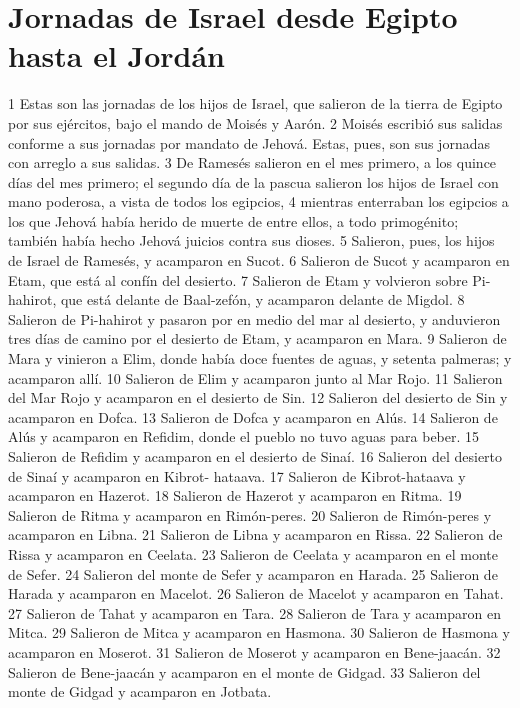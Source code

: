 \section*{Jornadas de Israel desde Egipto hasta el Jordán}

1 Estas son las jornadas de los hijos de Israel, que salieron de la tierra de Egipto por sus ejércitos, bajo el mando de Moisés y Aarón.
2 Moisés escribió sus salidas conforme a sus jornadas por mandato de Jehová. Estas, pues, son sus jornadas con arreglo a sus salidas.
3 De Ramesés salieron en el mes primero, a los quince días del mes primero; el segundo día de la pascua salieron los hijos de Israel con mano poderosa, a vista de todos los egipcios,
4 mientras enterraban los egipcios a los que Jehová había herido de muerte de entre ellos, a todo primogénito; también había hecho Jehová juicios contra sus dioses.
5 Salieron, pues, los hijos de Israel de Ramesés, y acamparon en Sucot.
6 Salieron de Sucot y acamparon en Etam, que está al confín del desierto.
7 Salieron de Etam y volvieron sobre Pi-hahirot, que está delante de Baal-zefón, y acamparon delante de Migdol.
8 Salieron de Pi-hahirot y pasaron por en medio del mar al desierto, y anduvieron tres días de camino por el desierto de Etam, y acamparon en Mara.
9 Salieron de Mara y vinieron a Elim, donde había doce fuentes de aguas, y setenta palmeras; y acamparon allí.
10 Salieron de Elim y acamparon junto al Mar Rojo.
11 Salieron del Mar Rojo y acamparon en el desierto de Sin.
12 Salieron del desierto de Sin y acamparon en Dofca.
13 Salieron de Dofca y acamparon en Alús.
14 Salieron de Alús y acamparon en Refidim, donde el pueblo no tuvo aguas para beber.
15 Salieron de Refidim y acamparon en el desierto de Sinaí.
16 Salieron del desierto de Sinaí y acamparon en Kibrot- hataava.
17 Salieron de Kibrot-hataava y acamparon en Hazerot.
18 Salieron de Hazerot y acamparon en Ritma.
19 Salieron de Ritma y acamparon en Rimón-peres.
20 Salieron de Rimón-peres y acamparon en Libna.
21 Salieron de Libna y acamparon en Rissa.
22 Salieron de Rissa y acamparon en Ceelata.
23 Salieron de Ceelata y acamparon en el monte de Sefer.
24 Salieron del monte de Sefer y acamparon en Harada.
25 Salieron de Harada y acamparon en Macelot.
26 Salieron de Macelot y acamparon en Tahat.
27 Salieron de Tahat y acamparon en Tara.
28 Salieron de Tara y acamparon en Mitca.
29 Salieron de Mitca y acamparon en Hasmona.
30 Salieron de Hasmona y acamparon en Moserot.
31 Salieron de Moserot y acamparon en Bene-jaacán.
32 Salieron de Bene-jaacán y acamparon en el monte de Gidgad.
33 Salieron del monte de Gidgad y acamparon en Jotbata.
